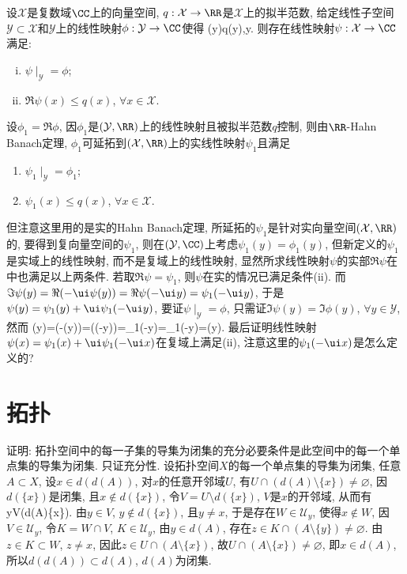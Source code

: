 设$\mathcal{X}$是复数域$\CC$上的向量空间, $q: \mathcal{X}\to\RR$是$\mathcal{X}$上的拟半范数, 
给定线性子空间$\mathcal{Y}\subset\mathcal{X}$和$\mathcal{Y}$上的线性映射$\phi: \mathcal{Y}\to\CC$使得
\bee
\Re\phi(y)\le q(y),\quad\forall y\in{}.
\eee
则存在线性映射$\psi:\mathcal{X}\to\CC$满足:
\begin{enumerate}[(i)]
 \item $\psi\mid_{\mathcal{Y}}=\phi$;
 \item $\Re\psi(x)\le q(x)$, $\forall x\in\mathcal{X}$.
\end{enumerate}
\eu
\ba
设$\phi_1=\Re\phi$, 因$\phi_1$是$(\mathcal{Y},\RR)$上的线性映射且被拟半范数$q$控制, 
则由$\RR$-Hahn Banach定理, $\phi_1$可延拓到$(\mathcal{X},\RR)$上的实线性映射$\psi_1$且满足
\begin{enumerate}[(i')]
 \item $\psi_1\mid_{\mathcal{Y}}=\phi_1$;
 \item $\psi_1(x)\le q(x)$, $\forall x\in\mathcal{X}$.
\end{enumerate}
但注意这里用的是实的Hahn Banach定理, 所延拓的$\psi_1$是针对实向量空间$(\mathcal{X},\RR)$的, 要得到复向量空间的$\psi_1$, 
则在$(\mathcal{Y},\CC)$上考虑$\psi_1(y)=\phi_1(y)$, 但新定义的$\psi_1$是实域上的线性映射, 而不是复域上的线性映射, 
显然所求线性映射$\psi$的实部$\Re\psi$在{\color{red}{实线性空间}}中也满足以上两条件. 
若取$\Re \psi=\psi_1$, 则$\psi$在实的情况已满足条件(ii). 而$\Im\psi(y)=\Re(-\ui\psi(y))=\Re\psi(-\ui y)=\psi_1(-\ui y)$, 于是$\psi(y)=\psi_1(y)+\ui\psi_1(-\ui y)$, 
要证$\psi\mid_{\mathcal{Y}}=\phi$, 只需证$\Im\psi(y)=\Im\phi(y)$, $\forall y\in\mathcal{Y}$, 然而
\bee
\Im\phi(y)=\Re(-\ui\phi(y))=\Re(\phi(-\ui y))=\phi_1(-\ui y)=\psi_1(-\ui y)=\Im\psi(y).
\eee
最后证明线性映射$\psi(x)=\psi_1(x)+\ui\psi_1(-\ui x)$在复域上满足(ii), 注意这里的$\psi_1(-\ui x)$是怎么定义的?
\ea


\section{拓扑}
证明: 拓扑空间中的每一子集的导集为闭集的充分必要条件是此空间中的每一个单点集的导集为闭集.
\et
\ba
只证充分性. 设拓扑空间$X$的每一个单点集的导集为闭集, 任意$A\subset X$, 设$x\in d(d(A))$, 对$x$的任意开邻域$U$,
有$U\cap(d(A)\setminus\{x\})\ne\varnothing$, 因$d(\{x\})$是闭集, 且$x\not\in d(\{x\})$, 令$V=U\setminus d(\{x\})$, 
$V$是$x$的开邻域, 从而有
\bee
y\in V\cap(d(A)\setminus\{x\}).
\eee
由$y\in V$, $y\not\in d(\{x\})$, 且$y\ne x$, 于是存在$W\in\mathscr{U}_y$, 使得$x\not\in W$, 因$V\in\mathscr{U}_y$, 
令$K=W\cap V$, $K\in\mathscr{U}_y$, 由$y\in d(A)$, 存在$z\in K\cap(A\setminus\{y\})\ne\varnothing$.
由$z\in K\subset W$, $z\ne x$, 因此$z\in U\cap(A\setminus\{x\})$, 故$U\cap(A\setminus\{x\})\ne\varnothing$,
即$x\in d(A)$, 所以$d(d(A))\subset d(A)$, $d(A)$为闭集.
\ea

